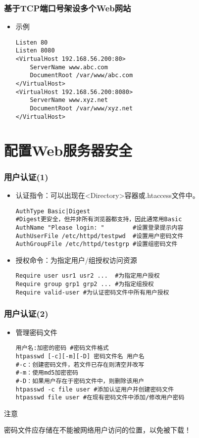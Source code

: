 \documentclass[xcolor=svgnames,presentation]{beamer}
\begin{document}
\begin{frame}[fragile]
\frametitle{基于TCP端口号架设多个Web网站}
\label{sec-3-8}
\begin{itemize}

\item 示例\\
\label{sec-3-8-1}%
\begin{verbatim}
Listen 80
Listen 8080
<VirtualHost 192.168.56.200:80>
    ServerName www.abc.com
    DocumentRoot /var/www/abc.com
</VirtualHost>
<VirtualHost 192.168.56.200:8080>
    ServerName www.xyz.net
    DocumentRoot /var/www/xyz.net
</VirtualHost>
\end{verbatim}
\end{itemize} %
\end{frame}
\section{配置Web服务器安全}
\label{sec-4}
\begin{frame}[fragile]
\frametitle{用户认证(1)}
\label{sec-4-1}
\begin{itemize}

\item 认证指令：可以出现在<Directory>容器或.htaccess文件中。\\
\label{sec-4-1-1}%
\begin{verbatim}
AuthType Basic|Digest
#Digest更安全，但并非所有浏览器都支持，因此通常用Basic
AuthName "Please login: "        #设置登录提示内容
AuthUserFile /etc/httpd/testpwd  #设置用户密码文件
AuthGroupFile /etc/httpd/testgrp #设置组密码文件
\end{verbatim}

\item 授权命令：为指定用户/组授权访问资源\\
\label{sec-4-1-2}%
\begin{verbatim}
Require user usr1 usr2 ...  #为指定用户授权
Require group grp1 grp2 ... #为指定组授权
Require valid-user #为认证密码文件中所有用户授权
\end{verbatim}
\end{itemize} %
\end{frame}
\begin{frame}[fragile]
\frametitle{用户认证(2)}
\label{sec-4-2}
\begin{itemize}

\item 管理密码文件\\
\label{sec-4-2-1}%
\begin{verbatim}
用户名:加密的密码 #密码文件格式
htpasswd [-c][-m][-D] 密码文件名 用户名
#-c：创建密码文件，若文件已存在则清空并改写
#-m：使用md5加密密码
#-D：如果用户存在于密码文件中，则删除该用户
htpasswd -c file user #添加认证用户并创建密码文件
htpasswd file user #在现有密码文件中添加/修改用户密码
\end{verbatim}
\end{itemize} %
\begin{block}{注意}
\label{sec-4-2-2}

密码文件应存储在不能被网络用户访问的位置，以免被下载！
\end{block}
\end{frame}
\end{document}
